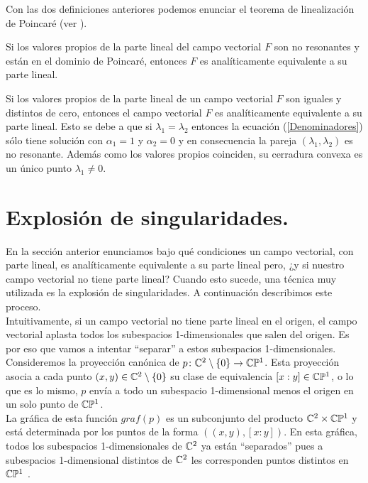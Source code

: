 Con las dos definiciones anteriores podemos enunciar el teorema de linealización de Poincaré (ver \cite{IlyaYako}).
\begin{Teorema}
Si los valores propios de la parte lineal del campo vectorial $F$ son no resonantes y están en el dominio de Poincaré, entonces $F$ es analíticamente equivalente a su parte lineal.
\end{Teorema}

\begin{Ejemplo}
\label{Ej:LinealizacionRadial}
Si los valores propios de la parte lineal de un campo vectorial $F$ son iguales y distintos de cero, entonces el campo vectorial $F$ es analíticamente equivalente a su parte lineal. Esto se debe a que si $\lambda_{1}=\lambda_{2}$ entonces la ecuación (\ref{Denominadores}) sólo tiene solución con $\alpha_{1}=1$ y $\alpha_{2}=0$ y en consecuencia la pareja $(\lambda_{1},\lambda_{2})$ es no resonante. Además como los valores propios coinciden, su cerradura convexa es un único punto $\lambda_{1}\neq 0$. 
\end{Ejemplo}

\section{Explosión de singularidades.}  

En la sección anterior enunciamos bajo qué condiciones un campo vectorial, con parte lineal, es analíticamente equivalente a su parte lineal pero, ¿y si nuestro campo vectorial no tiene parte lineal? Cuando esto sucede, una técnica muy utilizada es la explosión de singularidades. A continuación describimos este proceso.\\

Intuitivamente, si un campo vectorial no tiene parte lineal en el origen, el campo vectorial aplasta todos los subespacios 1-dimensionales que salen del origen. Es por eso que vamos a intentar ``separar'' a estos subespacios 1-dimensionales.\\

Consideremos la proyección canónica de $p\colon\mathbb{C}^{2}\setminus\{0\}\rightarrow\mathbb{C}\mathbb{P}^{1}$. Esta proyección asocia a cada punto $(x,y)\in\mathbb{C}^{2}\setminus\{0\}$ su clase de equivalencia $[x:y]\in\mathbb{C}\mathbb{P}^{1}$, o lo que es lo mismo, $p$ envía a todo un subespacio 1-dimensional menos el origen en un solo punto de $\mathbb{C}\mathbb{P}^{1}$.\\

La gráfica de esta función $graf(p)$ es un subconjunto del producto $\mathbb{C}^{2}\times\mathbb{C}\mathbb{P}^{1}$ y está determinada por los puntos de la forma $((x,y),[x:y])$. En esta gráfica, todos los subespacios 1-dimensionales de $\mathbb{C}^{2}$ ya están ``separados'' pues a subespacios 1-dimensional distintos de $\mathbb{C}^{2}$ les corresponden puntos distintos en $\mathbb{C}\mathbb{P}^{1}$ .\

